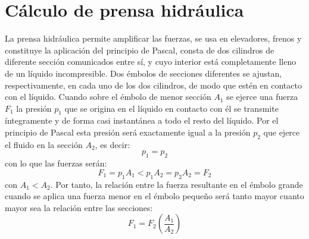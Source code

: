 \documentclass[../main]{subfiles}
\begin{document}
\section{Cálculo de prensa hidráulica}
La prensa hidráulica permite amplificar las fuerzas, se usa en
elevadores, frenos y constituye la aplicación del principio de
Pascal, consta de dos cilindros de diferente sección comunicados
entre sí, y cuyo interior está completamente lleno de un líquido
incompresible. Dos émbolos de secciones diferentes se ajustan,
respectivamente, en cada uno de los dos cilindros, de modo que estén
en contacto con el líquido. Cuando sobre el émbolo de menor sección
$A_1$ se ejerce una fuerza $F_1$ la presión $p_1$ que se origina en
el líquido en contacto con él se transmite íntegramente y de forma
casi instantánea a todo el resto del líquido. Por el principio de
Pascal esta presión será exactamente igual a la presión $p_2$ que
ejerce el fluido en la sección $A_2$, es decir:
\begin{equation}
  p_{1}=p_{2}
\end{equation}
con lo que las fuerzas serán:
\begin{equation}
  F_{1}=p_{1}A_{1}<p_{1}A_{2}=p_{2}A_{2}=F_{2}
\end{equation}
con $A_1 < A_2$. Por tanto, la relación entre la fuerza resultante en
el émbolo grande cuando se aplica una fuerza menor en el émbolo
pequeño será tanto mayor cuanto mayor sea la relación entre las secciones:
\begin{equation}
  F_{1}=F_{2}\left({\frac {A_{1}}{A_{2}}}\right)
\end{equation}
\end{document}
